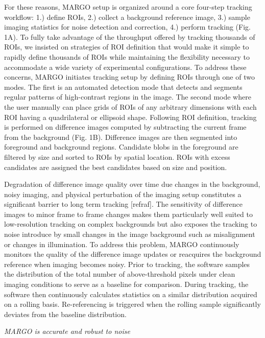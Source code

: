 \documentclass[10pt]{article}
\begin{document}
\begin{multicols}{2}
For these reasons, MARGO setup is organized around a core four-step tracking workflow: 1.) define ROIs, 2.) collect a background reference image, 3.) sample imaging statistics for noise detection and correction, 4.) perform tracking (Fig. 1A). To fully take advantage of the throughput offered by tracking thousands of ROIs, we insisted on strategies of ROI definition that would make it simple to rapidly define thousands of ROIs while maintaining the flexibility necessary to accommodate a wide variety of experimental configurations. To address these concerns, MARGO initiates tracking setup by defining ROIs through one of two modes. The first is an automated detection mode that detects and segments regular patterns of high-contrast regions in the image. The second mode where the user manually can place grids of ROIs of any arbitrary dimensions with each ROI having a quadrilateral or ellipsoid shape. Following ROI definition, tracking is performed on difference images computed by subtracting the current frame from the background (Fig. 1B). Difference images are then segmented into foreground and background regions. Candidate blobs in the foreground are filtered by size and sorted to ROIs by spatial location. ROIs with excess candidates are assigned the best candidates based on size and position.

Degradation of difference image quality over time due changes in the background, noisy imaging, and physical perturbation of the imaging setup constitutes a significant barrier to long term tracking [refraf]. The sensitivity of difference images to minor frame to frame changes makes them particularly well suited to low-resolution tracking on complex backgrounds but also exposes the tracking to noise introduce by small changes in the image background such as misalignment or changes in illumination. To address this problem, MARGO continuously monitors the quality of the difference image updates or reacquires the background reference when imaging becomes noisy. Prior to tracking, the software samples the distribution of the total number of above-threshold pixels under clean imaging conditions to serve as a baseline for comparison.  During tracking, the software then continuously calculates statistics on a similar distribution acquired on a rolling basis.  Re-referencing is triggered when the rolling sample significantly deviates from the baseline distribution.

\textit{MARGO is accurate and robust to noise}


\end{multicols}
\end{document}
